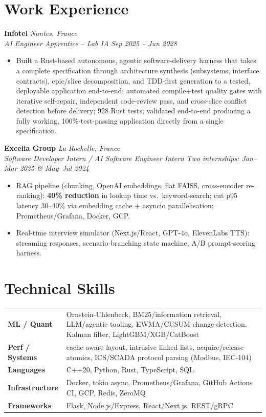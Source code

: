 \documentclass[10pt]{article}
\newcommand{\entry}[4]{%
  \noindent\textbf{#1} \hfill \textit{#2} \\
  \textit{#3} \hfill \textit{#4}\\[-0.3em]
}
\begin{document}
\section*{Work Experience}
\entry{Infotel}{Nantes, France}{AI Engineer Apprentice -- Lab IA}{Sep 2025 -- Jun 2028}
\begin{itemize}
  \item Built a Rust-based autonomous, agentic software-delivery harness that takes a complete specification through architecture synthesis (subsystems, interface contracts), epic/slice decomposition, and TDD-first generation to a tested, deployable application end-to-end; automated compile+test quality gates with iterative self-repair, independent code-review pass, and cross-slice conflict detection before delivery; 928 Rust tests; validated end-to-end producing a fully working, 100\%-test-passing application directly from a single specification.
\end{itemize}
\entry{Excelia Group}{La Rochelle, France}{Software Developer Intern / AI Software Engineer Intern}{Two internships: Jan--Mar 2025 \& May--Jul 2024}
\begin{itemize}
  \item RAG pipeline (chunking, OpenAI embeddings, flat FAISS, cross-encoder re-ranking): \textbf{40\% reduction} in lookup time vs.\ keyword-search; cut p95 latency 30--40\% via embedding cache + asyncio parallelisation; Prometheus/Grafana, Docker, GCP.
  \item Real-time interview simulator (Next.js/React, GPT-4o, ElevenLabs TTS): streaming responses, scenario-branching state machine, A/B prompt-scoring harness.
\end{itemize}

\section*{Technical Skills}
\noindent
\begin{tabular}{@{}p{2.7cm}p{15.5cm}@{}}
\textbf{ML / Quant} & Ornstein-Uhlenbeck, BM25/information retrieval, LLM/agentic tooling, EWMA/CUSUM change-detection, Kalman filter, LightGBM/XGB/CatBoost \\
\textbf{Perf / Systems} & cache-aware layout, intrusive linked lists, acquire/release atomics, ICS/SCADA protocol parsing (Modbus, IEC-104) \\
\textbf{Languages} & C++20, Python, Rust, TypeScript, SQL \\
\textbf{Infrastructure} & Docker, tokio async, Prometheus/Grafana, GitHub Actions CI, GCP, Redis, ZeroMQ \\
\textbf{Frameworks} & Flask, Node.js/Express, React/Next.js, REST/gRPC \\
\end{tabular}
\end{document}
